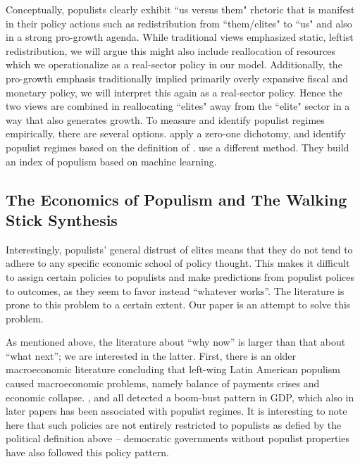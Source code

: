 \documentclass{OUP-EJ}
\begin{document}
Conceptually, populists clearly exhibit ``us versus them" rhetoric that is manifest in their policy actions such as redistribution from ``them/elites" to ``us" and also in a strong pro-growth agenda.  While traditional views emphasized static, leftist redistribution, we will argue this might also include reallocation of resources which we operationalize as a real-sector policy in our model. Additionally, the pro-growth emphasis traditionally implied primarily overly expansive fiscal and monetary policy, we will interpret this again as a real-sector policy. Hence the two views are combined in reallocating ``elites" away from the ``elite" sector in a way that also generates growth. To measure and identify populist regimes empirically, there are several options. \cite{FunkeEtAl2023} apply a zero-one dichotomy, and identify populist regimes based on the definition of \cite{Kaltwasser2018}. \cite{CelicoEtAl2024} use a different method. They build an index of populism based on machine learning.

\subsection{The Economics of Populism and The Walking Stick Synthesis}

Interestingly, populists’ general distrust of elites means that they do not tend to adhere to any specific economic school of policy thought. This makes it difficult to assign certain policies to populists and make predictions from populist polices to outcomes, as they seem to favor instead ``whatever works”. The literature is prone to this problem to a certain extent. Our paper is an attempt to solve this problem.

As mentioned above, the literature about ``why now” is larger than that about “what next”; we are interested in the latter. First, there is an older macroeconomic literature concluding that left-wing Latin American populism caused macroeconomic problems, namely balance of payments crises and economic collapse. \cite{Sachs1989}, \cite{DornbuschEdwards1990} and \cite{DornbuschEdwards1991} all detected a boom-bust pattern in GDP, which also in later papers has been associated with populist regimes. It is interesting to note here that such policies are not entirely restricted to populists as defied by the political definition above – democratic governments without populist properties have also followed this policy pattern.
\end{document}
